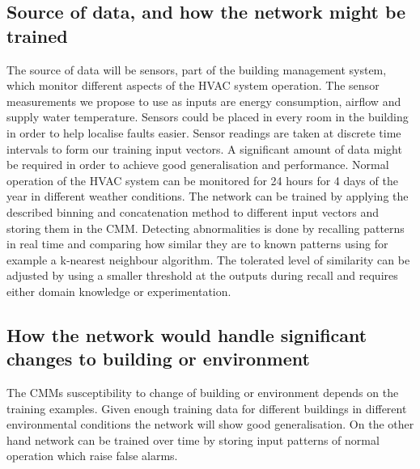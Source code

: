\documentclass[a4paper, 11pt]{article}
\begin{document}
\subsection{Source of data, and how the network might be trained}
The source of data will be sensors, part of the building management system, which monitor different aspects of the HVAC system operation. The sensor measurements we propose to use as inputs are energy consumption, airflow and supply water temperature. Sensors could be placed in every room in the building in order to help localise faults easier.  Sensor readings are taken at discrete time intervals to form our training input vectors. A significant amount of data might be required in order to achieve good generalisation and performance. Normal operation of the HVAC system can be monitored for 24 hours for 4 days of the year in different weather conditions. The network can be trained by applying the described binning and concatenation method to different input vectors and storing them in the CMM. Detecting abnormalities is done by recalling patterns in real time and comparing how similar they are to known patterns using for example a k-nearest neighbour algorithm. The tolerated level of similarity can be adjusted by using a smaller threshold at the outputs during recall and requires either domain knowledge or experimentation. 
\subsection{How the network would handle significant changes to building or environment}
The CMMs susceptibility to change of building or environment depends on the training examples. Given enough training data for different buildings in different environmental conditions the network will show good generalisation. On the other hand network can be trained over time by storing input patterns of normal operation which raise false alarms.





\pagebreak
\appendix
\appendixpage


\end{document}
